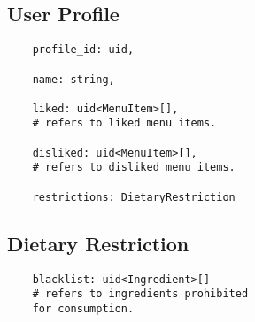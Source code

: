 \subsection{User Profile}
\label{schema:user-profile}
\begin{verbatim}
    profile_id: uid,
    
    name: string,
    
    liked: uid<MenuItem>[],
    # refers to liked menu items.

    disliked: uid<MenuItem>[],
    # refers to disliked menu items.

    restrictions: DietaryRestriction
\end{verbatim}

\subsection{Dietary Restriction}
\label{schema:dietary-restriction}
\begin{verbatim}
    blacklist: uid<Ingredient>[]
    # refers to ingredients prohibited
    for consumption.
\end{verbatim}